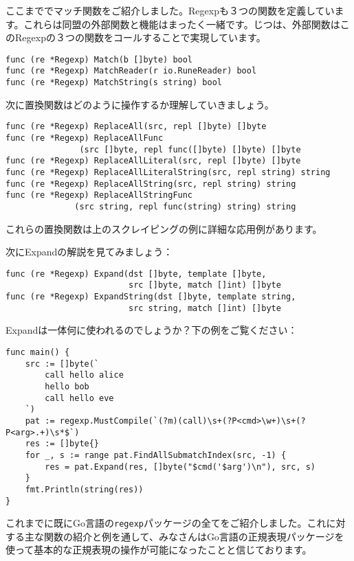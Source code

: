 ここまででマッチ関数をご紹介しました。Regexpも３つの関数を定義しています。これらは同盟の外部関数と機能はまったく一緒です。じつは、外部関数はこのRegexpの３つの関数をコールすることで実現しています。

\begin{lstlisting}[numbers=none]
func (re *Regexp) Match(b []byte) bool
func (re *Regexp) MatchReader(r io.RuneReader) bool
func (re *Regexp) MatchString(s string) bool
\end{lstlisting}

次に置換関数はどのように操作するか理解していきましょう。

\begin{lstlisting}[numbers=none]
func (re *Regexp) ReplaceAll(src, repl []byte) []byte
func (re *Regexp) ReplaceAllFunc
               (src []byte, repl func([]byte) []byte) []byte
func (re *Regexp) ReplaceAllLiteral(src, repl []byte) []byte
func (re *Regexp) ReplaceAllLiteralString(src, repl string) string
func (re *Regexp) ReplaceAllString(src, repl string) string
func (re *Regexp) ReplaceAllStringFunc
              (src string, repl func(string) string) string
\end{lstlisting}


これらの置換関数は上のスクレイピングの例に詳細な応用例があります。

次にExpandの解説を見てみましょう：

\begin{lstlisting}[numbers=none]
func (re *Regexp) Expand(dst []byte, template []byte,
                         src []byte, match []int) []byte
func (re *Regexp) ExpandString(dst []byte, template string,
                         src string, match []int) []byte
\end{lstlisting}

Expandは一体何に使われるのでしょうか？下の例をご覧ください：

\begin{lstlisting}[numbers=none]
func main() {
    src := []byte(`
        call hello alice
        hello bob
        call hello eve
    `)
    pat := regexp.MustCompile(`(?m)(call)\s+(?P<cmd>\w+)\s+(?P<arg>.+)\s*$`)
    res := []byte{}
    for _, s := range pat.FindAllSubmatchIndex(src, -1) {
        res = pat.Expand(res, []byte("$cmd('$arg')\n"), src, s)
    }
    fmt.Println(string(res))
}
\end{lstlisting}

これまでに既にGo言語の\texttt{regexp}パッケージの全てをご紹介しました。これに対する主な関数の紹介と例を通して、みなさんはGo言語の正規表現パッケージを使って基本的な正規表現の操作が可能になったことと信じております。

